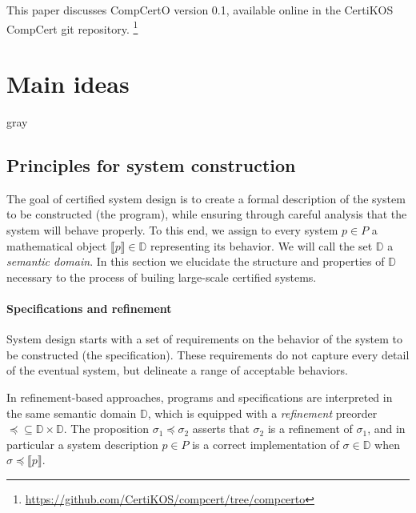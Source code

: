 \documentclass[sigplan,10pt,review]{acmart}
\newcommand{\refby}{\preceq}
\newenvironment{optional}{\begin{color}{gray}}{\end{color}}
\begin{document}

This paper discusses CompCertO version 0.1,
available online in the CertiKOS CompCert git repository.%
\footnote{\url{https://github.com/CertiKOS/compcert/tree/compcerto}}



\section{Main ideas} \label{sec:mainideas} %

\begin{optional}
\subsection{Principles for system construction} \label{sec:principles} %


The goal of certified system design is
to create a formal description of
the system to be constructed (the program),
while ensuring
through careful analysis
that the system
will behave properly.
To this end,
we assign
to every system $p \in P$
a mathematical object $\llbracket p \rrbracket \in \mathbb{D}$
representing its behavior.
We will call the set $\mathbb{D}$ a \emph{semantic domain}.
In this section we elucidate
the structure and properties of $\mathbb{D}$
necessary to the process of builing
large-scale certified systems.


\paragraph{Specifications and refinement} %

System design starts with a set of requirements
on the behavior of the system to be constructed
(the specification).
These requirements do not capture every detail
of the eventual system,
but delineate a range of acceptable behaviors.

In refinement-based approaches,
programs and specifications are interpreted in the same
semantic domain $\mathbb{D}$,
which is equipped with a \emph{refinement} preorder
${\refby} \subseteq \mathbb{D} \times \mathbb{D}$.
The proposition $\sigma_1 \refby \sigma_2$
asserts that $\sigma_2$ is a refinement of $\sigma_1$,
and in particular a system description $p \in P$ is a correct implementation
of $\sigma \in \mathbb{D}$ when
$\sigma \refby \llbracket p \rrbracket$.


\end{optional}
\end{document}
